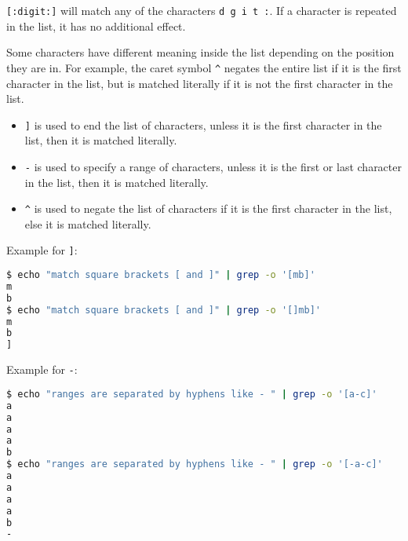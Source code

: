 \lstinline|[:digit:]| will match any of the characters \lstinline|d g i t :|.
If a character is repeated in the list, it has no additional effect.

Some characters have different meaning inside the list depending on the
position they are in. For example, the caret symbol \lstinline|^| negates
the entire list if it is the first character in the list, but is matched
literally if it is not the first character in the list.

\begin{itemize}
  \item \lstinline|]| is used to end the list of characters, unless it is the first character in the list, then it is matched literally.
  \item \lstinline|-| is used to specify a range of characters, unless it is the first or last character in the list, then it is matched literally.
  \item \lstinline|^| is used to negate the list of characters if it is the first character in the list, else it is matched literally.
\end{itemize}

Example for \lstinline|]|:
\begin{lstlisting}[language=bash]
$ echo "match square brackets [ and ]" | grep -o '[mb]'
m
b
$ echo "match square brackets [ and ]" | grep -o '[]mb]'
m
b
]
\end{lstlisting}

Example for \lstinline|-|:
\begin{lstlisting}[language=bash]
$ echo "ranges are separated by hyphens like - " | grep -o '[a-c]'
a
a
a
a
b
$ echo "ranges are separated by hyphens like - " | grep -o '[-a-c]'
a
a
a
a
b
-
\end{lstlisting}

